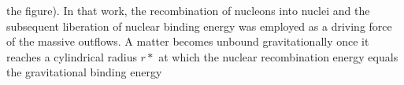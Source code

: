 the figure). 
%
%
%
%
In that work, the recombination of nucleons into nuclei and the subsequent 
liberation of nuclear binding energy was employed as a driving force 
of the massive outflows. A matter becomes unbound gravitationally 
once it reaches a cylindrical radius $r*$ at which the nuclear recombination energy 
equals the gravitational binding energy
\citep[\eg][]{Fernandez:2013tya}

